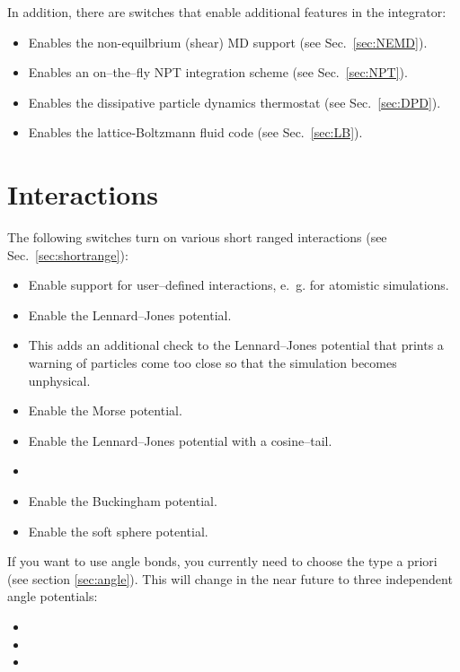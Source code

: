 In addition, there are switches that enable additional features in the integrator:
\begin{itemize}
\item {} Enables the non-equilbrium (shear) MD support (see Sec.~\ref{sec:NEMD}).
\item {} Enables an on--the--fly NPT integration scheme (see Sec.~\ref{sec:NPT}).
\item {} Enables the dissipative particle dynamics thermostat (see
  Sec.~\ref{sec:DPD}).
\item {} Enables the lattice-Boltzmann fluid code (see Sec.~\ref{sec:LB}).
\end{itemize}

\section{Interactions}
The following switches turn on various short ranged interactions (see Sec.~\ref{sec:shortrange}):
\begin{itemize}
\item {} Enable support for user--defined interactions, e.~g. for atomistic
  simulations.
\item {} Enable the Lennard--Jones potential.
\item {} This adds an additional check to the Lennard--Jones
  potential that prints a warning of particles come too close so that the simulation becomes
  unphysical.
\item {} Enable the Morse potential.
\item {} Enable the Lennard--Jones potential with a cosine--tail.
\item {}
\item {} Enable the Buckingham potential.
\item {} Enable the soft sphere potential.
\end{itemize}

If you want to use angle bonds, you currently need to choose the type
a priori (see section \vref{sec:angle}). This will change in the near
future to three independent angle potentials:
\begin{itemize}
\item {}
\item {}
\item {}
\end{itemize}

